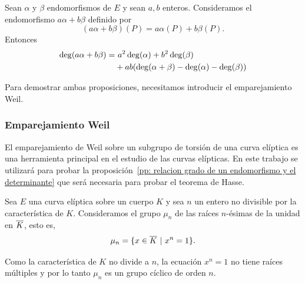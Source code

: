 \begin{proposicion}\label{pp:grado endomorfismo a*alpha + b*beta}
	Sean $\alpha$ y $\beta$ endomorfismos de $E$ y sean $a, b$ enteros. Consideramos el endomorfismo $a \alpha + b \beta$ definido por
	$$
		(a \alpha + b \beta)(P) = a \alpha(P) + b \beta(P).
	$$
	Entonces
	\begin{align*}
		\deg(a \alpha + b \beta) =& \ a^2 \deg(\alpha) + b^2 \deg(\beta) \\
		&+ a b (\deg(\alpha + \beta) - \deg(\alpha) - \deg(\beta))
	\end{align*}
\end{proposicion}

Para demostrar ambas proposiciones, necesitamos introducir el emparejamiento Weil.

\subsubsection{Emparejamiento Weil}
\label{subs:Emparejamiento Weil}

El emparejamiento de Weil sobre un subgrupo de torsión de una curva elíptica es una herramienta principal en el estudio de las curvas elípticas. En este trabajo se utilizará para probar la proposición~\ref{pp: relacion grado de un endomorfismo y el determinante} que será necesaria para probar el teorema de Hasse.

Sea $E$ una curva elíptica sobre un cuerpo $K$ y sea $n$ un entero no divisible por la característica de $K$. Consideramos el grupo $\mu_n$ de las raíces $n$-ésimas de la unidad en $\overline{K}$, esto es,
$$
	\mu_n = \{ x \in \overline{K} \ | \ x^n = 1 \}.
$$

Como la característica de $K$ no divide a $n$, la ecuación $x^n = 1$ no tiene raíces múltiples y por lo tanto $\mu_n$ es un grupo cíclico de orden $n$.

